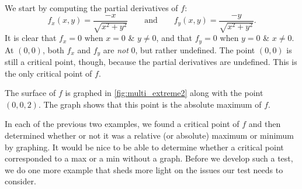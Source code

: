 {We start by computing the partial derivatives of $f$:
$$f_x(x,y) = \frac{-x}{\sqrt{x^2+y^2}}\qquad \text{and}\qquad f_y(x,y) = \frac{-y}{\sqrt{x^2+y^2}}.$$
It is clear that $f_x=0$ when $x=0$ \& $y\neq0$, and that $f_y=0$ when $y=0$ \& $x\neq0$. At $(0,0)$, both $f_x$ and $f_y$ are \textit{not} $0$, but rather undefined. The point $(0,0)$ is still a critical point, though, because the partial derivatives are undefined. This is the only critical point of $f$.

The surface of $f$ is graphed in \autoref{fig:multi_extreme2} along with the point $(0,0,2)$. The graph shows that this point is the absolute maximum of $f$.}

In each of the previous two examples, we found a critical point of $f$ and then determined whether or not it was a relative (or absolute) maximum or minimum by graphing. It would be nice to be able to determine whether a critical point corresponded to a max or a min without a graph. Before we develop such a test, we do one more example that sheds more light on the issues our test needs to consider.\\

